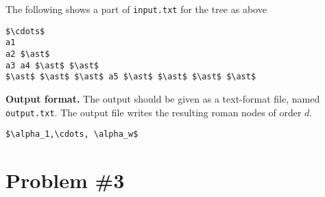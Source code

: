 \documentclass{article}
\newcommand{\lcm}{{\mathrm{lcm}}}
\begin{document}
\begin{figure}[h]
\centering
{}
\end{figure} 

The following shows a part of  \texttt{input.txt} for the tree as above
\begin{lstlisting}[backgroundcolor=\color{yellow!40}]
$\cdots$
a1
a2 $\ast$
a3 a4 $\ast$ $\ast$
$\ast$ $\ast$ $\ast$ a5 $\ast$ $\ast$ $\ast$ $\ast$
\end{lstlisting}
 

\bigskip
\noindent\textbf{Output format.} %
The output should be given as a text-format file, named \texttt{output.txt}.
The output file writes the resulting roman nodes of order $d$.
% 
\begin{lstlisting}[backgroundcolor=\color{yellow!40}]
$\alpha_1,\cdots, \alpha_w$
\end{lstlisting}
%
\newpage
\section{Problem \#3} 
\end{document}

